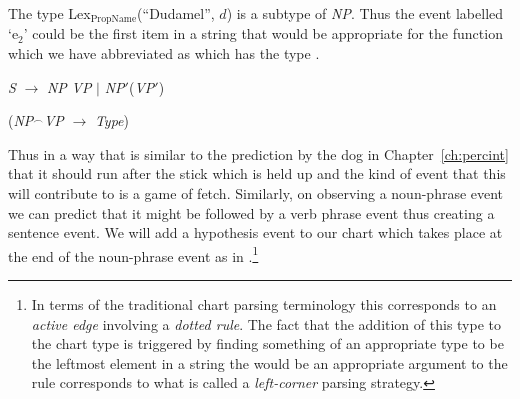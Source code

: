 The type Lex$_{\mathrm{PropName}}$(``Dudamel'', $d$) is a subtype of
\textit{NP}.  Thus the event labelled `e$_2$' could be the first item
in a string that would be appropriate for the function which we have
abbreviated as  %
which has the type .
\begin{ex} 
\begin{subex} 
 
\item \textit{S} $\longrightarrow$ \textit{NP} \textit{VP} $\mid$
\textit{NP}$'$(\textit{VP}$'$) 
 
\item (\textit{NP}$^{\frown}$\textit{VP} $\rightarrow$ \textit{Type}) 
 
\end{subex} 
   
\end{ex} 
Thus in a way that is similar to the prediction by the dog in
Chapter~\ref{ch:percint} that it should run after the stick which is
held up and the
kind of event that this will contribute to is a game of fetch. Similarly, on
observing a noun-phrase event we can predict that it might be followed
by a verb phrase event thus creating a sentence event.  We will add a
hypothesis event to our chart which takes place at the end of the
noun-phrase event as in \nexteg{}.\footnote{In terms of the traditional chart parsing
  terminology this corresponds to an \textit{active edge} involving a
  \textit{dotted rule}.  The fact that the addition of this type to
  the chart type is triggered by finding something of an appropriate
  type to be the leftmost element in a string the would be an
  appropriate argument to the rule corresponds to what is called a
  \textit{left-corner} parsing strategy.} 
